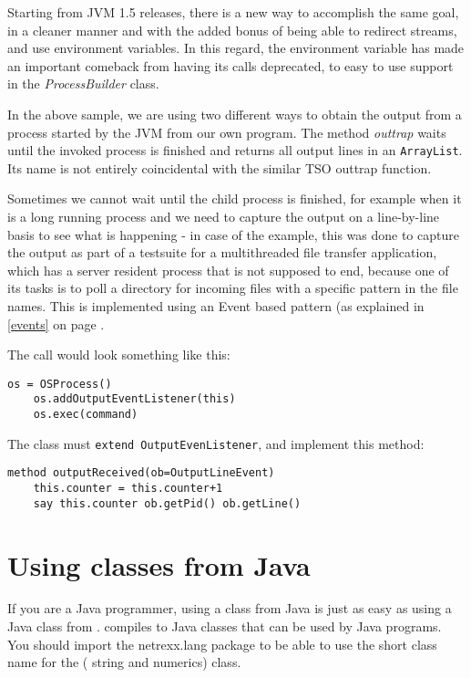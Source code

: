 {Starting from JVM 1.5 releases, there is a new way to accomplish the
same goal, in a cleaner manner and with the added bonus of being able
to redirect streams, and use environment variables. In this regard,
the environment variable has made an important comeback from having
its calls deprecated, to easy to use support in the
\emph{ProcessBuilder} class. 
 
In the above sample, we are using two different ways to obtain the
output from a process started by the JVM from our own program. The
method \emph{outtrap} waits until the invoked process is finished and
returns all output lines in an \texttt{ArrayList}. Its name is not
entirely coincidental with the similar TSO outtrap function. 

Sometimes we cannot wait until the child process is finished, for
example when it is a long running process and we need to capture the
output on a line-by-line basis to see what is happening - in case of
the example, this was done to capture the output as part of a
testsuite for a multithreaded file transfer application, which has a
server resident process that is not supposed to end, because one of
its tasks is to poll a directory for incoming files with a specific
pattern in the file names. This is implemented using an Event based
pattern (as explained in \ref{events}  on page \pageref{events}. 
 

 

The call would look something like this:
\begin{lstlisting}[label=callosprocessexample,caption=Example of calling the OSProcess class - registering an eventhandler]
    os = OSProcess()
    os.addOutputEventListener(this)
    os.exec(command)
\end{lstlisting}

The class must \texttt{extend OutputEvenListener}, and implement this
method:

\begin{lstlisting}[label=registerhandlerexample,caption=Example of implementing the listener method]
  method outputReceived(ob=OutputLineEvent)
    this.counter = this.counter+1
    say this.counter ob.getPid() ob.getLine()
\end{lstlisting}

\chapter{Using \nr{} classes from Java}
If you are a Java programmer, using a \nr{} class from Java is just as
easy as using a Java class from \nr{}. \nr{} compiles to Java classes that can be used by Java programs.
You should import the netrexx.lang package to be able to use the short
class name for the \Rexx{} (\nr{} string and numerics) class.

}
